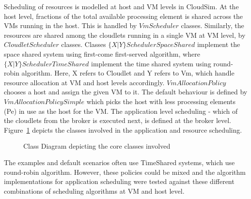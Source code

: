 \documentclass[times, 10pt,twocolumn]{article}
\begin{document}
Scheduling of resources is modelled at host and VM levels in CloudSim. At the host level, fractions of the total available processing element is shared across the VMs running in the host. This is handled by $VmScheduler$ classes. Similarly, the resources are shared among the cloudlets running in a single VM at VM level, by $CloudletScheduler$ classes. Classes $\{X|Y\}SchedulerSpaceShared$ implement the space shared system using first-come first-served algorithm, where $\{X|Y\}SchedulerTimeShared$ implement the time shared system using round-robin algorithm. Here, X refers to Cloudlet and Y refers to Vm, which handle resource allocation at VM and host levels accordingly. $VmAllocationPolicy$ chooses a host and assign the given VM to it. The default behaviour is defined by $VmAllocationPolicySimple$ which picks the host with less processing elements (Pe) in use as the host for the VM. The application level scheduling - which of the cloudlets from the broker is executed next, is defined at the broker level. Figure~\ref{fig:classdiagram} depicts the classes involved in the application and resource scheduling.
\begin{figure}[ht]
 \caption{Class Diagram depicting the core classes involved}
 \label{fig:classdiagram}
\end{figure}

The examples and default scenarios often use TimeShared systems, which use round-robin algorithm. However, these policies could be mixed and the algorithm implementations for application scheduling were tested against these different combinations of scheduling algorithms at VM and host level.
\end{document}
